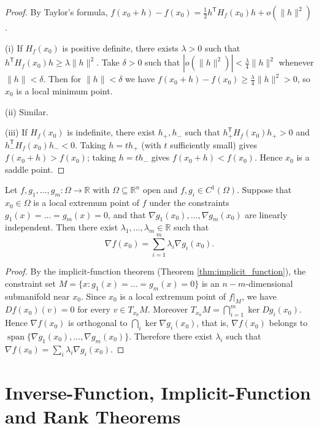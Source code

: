 \begin{proof}
By Taylor's formula, $f(x_0 + h) - f(x_0) = \frac{1}{2} h^{\mathsf T} H_f(x_0) h + o(\|h\|^2)$.

(i) If $H_f(x_0)$ is positive definite, there exists $\lambda > 0$ such that $h^{\mathsf T} H_f(x_0) h \ge \lambda \|h\|^2$. Take $\delta > 0$ such that $|o(\|h\|^2)| < \frac{\lambda}{4} \|h\|^2$ whenever $\|h\| < \delta$. Then for $\|h\| < \delta$ we have $f(x_0 + h) - f(x_0) \ge \frac{\lambda}{4} \|h\|^2 > 0$, so $x_0$ is a local minimum point.

(ii) Similar.

(iii) If $H_f(x_0)$ is indefinite, there exist $h_+, h_-$ such that $h_+^{\mathsf T} H_f(x_0) h_+ > 0$ and $h_-^{\mathsf T} H_f(x_0) h_- < 0$. Taking $h = t h_+$ (with $t$ sufficiently small) gives $f(x_0 + h) > f(x_0)$; taking $h = t h_-$ gives $f(x_0 + h) < f(x_0)$. Hence $x_0$ is a saddle point.
\end{proof}

\begin{theorem}\label{thm:lagrange_multiplier_ra}
Let $f, g_1, \dots, g_m: \Omega \to \mathbb{R}$ with $\Omega \subseteq \mathbb{R}^n$ open and $f, g_i \in C^1(\Omega)$. Suppose that $x_0 \in \Omega$ is a local extremum point of $f$ under the constraints $g_1(x) = \dots = g_m(x) = 0$, and that $\nabla g_1(x_0), \dots, \nabla g_m(x_0)$ are linearly independent. Then there exist $\lambda_1, \dots, \lambda_m \in \mathbb{R}$ such that
\[
\nabla f(x_0) = \sum_{i=1}^{m} \lambda_i \nabla g_i(x_0).
\]
\end{theorem}

\begin{proof}
By the implicit-function theorem (Theorem \ref{thm:implicit_function}), the constraint set $M = \{x : g_1(x) = \dots = g_m(x) = 0\}$ is an $n - m$-dimensional submanifold near $x_0$. Since $x_0$ is a local extremum point of $f|_M$, we have $Df(x_0)(v) = 0$ for every $v \in T_{x_0} M$. Moreover $T_{x_0} M = \bigcap_{i=1}^{m} \ker Dg_i(x_0)$. Hence $\nabla f(x_0)$ is orthogonal to $\bigcap_i \ker \nabla g_i(x_0)$, that is, $\nabla f(x_0)$ belongs to $\operatorname{span}\{\nabla g_1(x_0), \dots, \nabla g_m(x_0)\}$. Therefore there exist $\lambda_i$ such that $\nabla f(x_0) = \sum_i \lambda_i \nabla g_i(x_0)$.
\end{proof}

\section{Inverse-Function, Implicit-Function and Rank Theorems}

